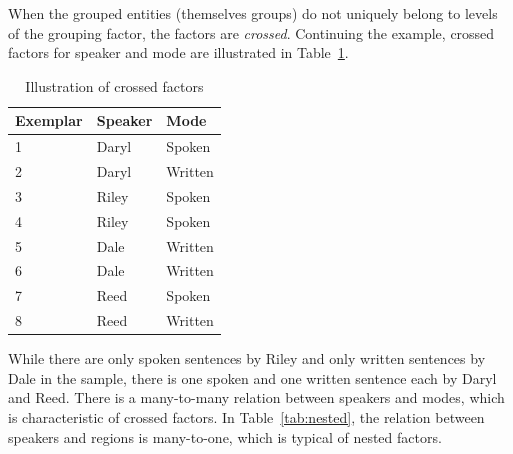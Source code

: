 \documentclass[a4paper,12pt]{article}
\begin{document}
When the grouped entities (themselves groups) do not uniquely belong to levels of the grouping factor, the factors are \textit{crossed}.
Continuing the example, crossed factors for speaker and mode are illustrated in Table~\ref{tab:crossed}.
%
\begin{table}
  \centering
  \begin{tabular}{lll}
    \toprule
    \textbf{Exemplar} & \textbf{Speaker}  & \textbf{Mode}   \\
    \midrule
                    1 &           Daryl  &         Spoken  \\
                    2 &           Daryl  &         Written \\
                    3 &           Riley  &         Spoken  \\
                    4 &           Riley  &         Spoken  \\
                    5 &           Dale   &         Written \\
                    6 &           Dale   &         Written \\
                    7 &           Reed   &         Spoken  \\
                    8 &           Reed   &         Written \\
    \bottomrule
  \end{tabular}
  \caption{Illustration of crossed factors}
  \label{tab:crossed}
\end{table}
%
While there are only spoken sentences by Riley and only written sentences by Dale in the sample, there is one spoken and one written sentence each by Daryl and Reed.
There is a many-to-many relation between speakers and modes, which is characteristic of crossed factors.
In Table~\ref{tab:nested}, the relation between speakers and regions is many-to-one, which is typical of nested factors.
\end{document}
